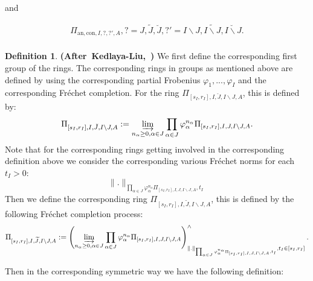 \documentclass[12pt]{amsart}
\theoremstyle{definition}
\newtheorem{definition}[theorem]{Definition}
\numberwithin{equation}{section}
\begin{document}
and 

\begin{align}
\Pi_{\mathrm{an},\mathrm{con},I,?,?',A},?=J,\widetilde{J},\breve{J},?'=I\backslash J,\widetilde{I\backslash J},\breve{I\backslash J}.\\	
\end{align}



\begin{definition}\mbox{\bf{(After Kedlaya-Liu, \cite[Definition 5.2.1]{KL2})}}
We first define the corresponding first group of the rings. The corresponding rings in groups as mentioned above are defined by using the corresponding partial Frobenius $\varphi_1,...,\varphi_I$ and the corresponding Fr\'echet completion.	For the ring $\Pi_{[s_I,r_I],I,\breve{J},I\backslash J,A}$, this is defined by:
\begin{align}
\Pi_{[s_I,r_I],I,\breve{J},I\backslash J,A}:=\varinjlim_{n_\alpha\geq 0,\alpha  \in J}\prod_{\alpha\in J}\varphi_\alpha^{n_\alpha}\Pi_{[s_I,r_I],I,{J},I\backslash J,A}.
\end{align}
Note that for the corresponding rings getting involved in the corresponding definition above we consider the corresponding various Fr\'echet norms for each $t_I>0$:
\begin{displaymath}
\|.\|_{\prod_{\alpha\in J}\varphi_\alpha^{n_\alpha}\Pi_{[s_I,r_I],I,{J},I\backslash J,A},t_I}	
\end{displaymath}
Then we define the corresponding ring $\Pi_{[s_I,r_I],I,\widetilde{J},I\backslash J,A}$, this is defined by the following Fr\'echet completion process:
\begin{align}
\Pi_{[s_I,r_I],I,\widetilde{J},I\backslash J,A}:=\left(\varinjlim_{n_\alpha\geq 0,\alpha  \in J}\prod_{\alpha\in J}\varphi_\alpha^{n_\alpha}\Pi_{[s_I,r_I],I,{J},I\backslash J,A}\right)^\wedge_{\|.\|_{\prod_{\alpha\in J}\varphi_\alpha^{n_\alpha}\Pi_{[s_I,r_I],I,{J},I\backslash J,A},t_I},t_I\in [s_I,r_I]}.
\end{align}

  
\end{definition}


\indent Then in the corresponding symmetric way we have the following definition:
\end{document}
